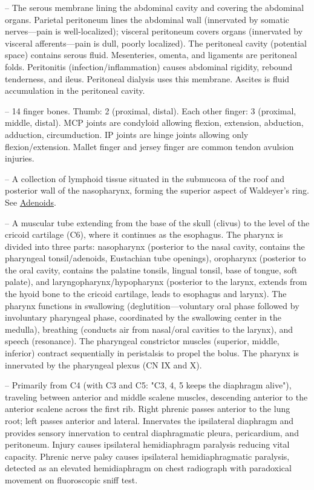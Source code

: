 -- The serous membrane lining the abdominal cavity and covering the abdominal organs. Parietal peritoneum lines the abdominal wall (innervated by somatic nerves—pain is well-localized); visceral peritoneum covers organs (innervated by visceral afferents—pain is dull, poorly localized). The peritoneal cavity (potential space) contains serous fluid. Mesenteries, omenta, and ligaments are peritoneal folds. Peritonitis (infection/inflammation) causes abdominal rigidity, rebound tenderness, and ileus. Peritoneal dialysis uses this membrane. Ascites is fluid accumulation in the peritoneal cavity.

-- 14 finger bones. Thumb: 2 (proximal, distal). Each other finger: 3 (proximal, middle, distal). MCP joints are condyloid allowing flexion, extension, abduction, adduction, circumduction. IP joints are hinge joints allowing only flexion/extension. Mallet finger and jersey finger are common tendon avulsion injuries.

-- A collection of lymphoid tissue situated in the submucosa of the roof and posterior wall of the nasopharynx, forming the superior aspect of Waldeyer's ring. See \hyperlink{Adenoids}{Adenoids}.

-- A muscular tube extending from the base of the skull (clivus) to the level of the cricoid cartilage (C6), where it continues as the esophagus. The pharynx is divided into three parts: nasopharynx (posterior to the nasal cavity, contains the pharyngeal tonsil/adenoids, Eustachian tube openings), oropharynx (posterior to the oral cavity, contains the palatine tonsils, lingual tonsil, base of tongue, soft palate), and laryngopharynx/hypopharynx (posterior to the larynx, extends from the hyoid bone to the cricoid cartilage, leads to esophagus and larynx). The pharynx functions in swallowing (deglutition—voluntary oral phase followed by involuntary pharyngeal phase, coordinated by the swallowing center in the medulla), breathing (conducts air from nasal/oral cavities to the larynx), and speech (resonance). The pharyngeal constrictor muscles (superior, middle, inferior) contract sequentially in peristalsis to propel the bolus. The pharynx is innervated by the pharyngeal plexus (CN IX and X).

-- Primarily from C4 (with C3 and C5: "C3, 4, 5 keeps the diaphragm alive"), traveling between anterior and middle scalene muscles, descending anterior to the anterior scalene across the first rib. Right phrenic passes anterior to the lung root; left passes anterior and lateral. Innervates the ipsilateral diaphragm and provides sensory innervation to central diaphragmatic pleura, pericardium, and peritoneum. Injury causes ipsilateral hemidiaphragm paralysis reducing vital capacity. Phrenic nerve palsy causes ipsilateral hemidiaphragmatic paralysis, detected as an elevated hemidiaphragm on chest radiograph with paradoxical movement on fluoroscopic sniff test.

